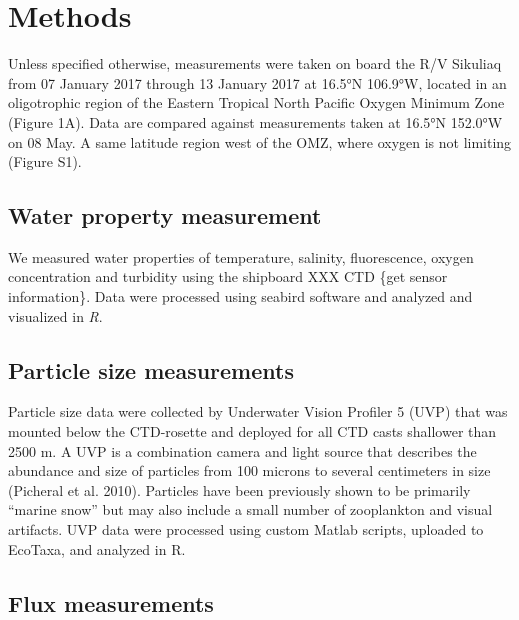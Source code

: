 \documentclass[]{article}
\begin{document}
\hypertarget{methods}{%
\section{Methods}\label{methods}}

Unless specified otherwise, measurements were taken on board the R/V
Sikuliaq from 07 January 2017 through 13 January 2017 at 16.5°N 106.9°W,
located in an oligotrophic region of the Eastern Tropical North Pacific
Oxygen Minimum Zone (Figure 1A). Data are compared against measurements
taken at 16.5°N 152.0°W on 08 May. A same latitude region west of the
OMZ, where oxygen is not limiting (Figure S1).

\hypertarget{water-property-measurement}{%
\subsection{Water property
measurement}\label{water-property-measurement}}

We measured water properties of temperature, salinity, fluorescence,
oxygen concentration and turbidity using the shipboard XXX CTD \{get
sensor information\}. Data were processed using seabird software and
analyzed and visualized in \emph{R}.

\hypertarget{particle-size-measurements}{%
\subsection{Particle size
measurements}\label{particle-size-measurements}}

Particle size data were collected by Underwater Vision Profiler 5 (UVP)
that was mounted below the CTD-rosette and deployed for all CTD casts
shallower than 2500 m. A UVP is a combination camera and light source
that describes the abundance and size of particles from 100 microns to
several centimeters in size (Picheral et al. 2010). Particles have been
previously shown to be primarily ``marine snow'' but may also include a
small number of zooplankton and visual artifacts. UVP data were
processed using custom Matlab scripts, uploaded to EcoTaxa, and analyzed
in R.

\hypertarget{flux-measurements}{%
\subsection{Flux measurements}\label{flux-measurements}}
\end{document}

